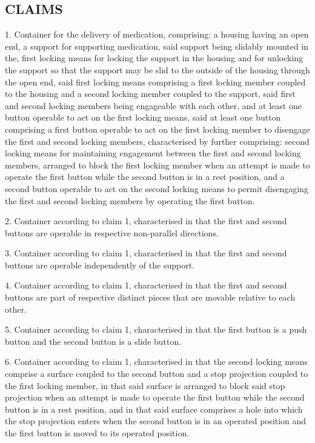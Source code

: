 \documentclass[11pt,a4paper]{article}
\begin{document}
\subsection{CLAIMS}

1. Container for the delivery of medication, comprising: a housing having an open end, a support for supporting medication, said support being slidably mounted in the, first locking means for locking the support in the housing and for unlocking the support so that the support may be slid to the outside of the housing through the open end, said first locking means comprising a first locking member coupled to the housing and a second locking member coupled to the support, said first and second locking members being engageable with each other, and at least one button operable to act on the first locking means, said at least one button comprising a first button operable to act on the first locking member to disengage the first and second locking members, characterised by further comprising: second locking means for maintaining engagement between the first and second locking members, arranged to block the first locking member when an attempt is made to operate the first button while the second button is in a rest position, and a second button operable to act on the second locking means to permit disengaging the first and second locking members by operating the first button.

2. Container according to claim 1, characterised in that the first and second buttons are operable in respective non-parallel directions.

3. Container according to claim 1, characterised in that the first and second buttons are operable independently of the support.

4. Container according to claim 1, characterised in that the first and second buttons are part of respective distinct pieces that are movable relative to each other.

5. Container according to claim 1, characterised in that the first button is a push button and the second button is a slide button.

6. Container according to claim 1, characterised in that the second locking means comprise a surface coupled to the second button and a stop projection coupled to the first locking member, in that said surface is arranged to block said stop projection when an attempt is made to operate the first button while the second button is in a rest position, and in that said surface comprises a hole into which the stop projection enters when the second button is in an operated position and the first button is moved to its operated position.
\end{document}
